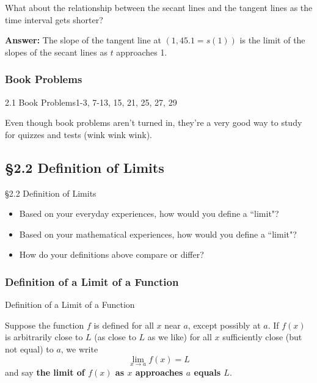 \documentclass[cal1spr16Lectures.tex]{subfiles}
\begin{document}
\begin{frame}
\begin{que} What about the relationship between the \alert{secant} lines and the \alert{tangent} lines as the time interval gets shorter? \end{que}

{\bf Answer:} The slope of the tangent line at $(1, 45.1=s(1))$ is the limit of the slopes of the secant lines as $t$ approaches 1.
\end{frame}

\subsubsection{Book Problems}
\begin{frame}
\begin{block}{2.1 Book Problems}1-3, 7-13, 15, 21, 25, 27, 29\end{block}
Even though book problems aren't turned in, they're a very good way to study for quizzes and tests (wink wink wink).  
\end{frame}

\subsection[2.2 Definition of Limits]{\S 2.2 Definition of Limits}

\begin{frame}{\S 2.2 Definition of Limits}
\begin{que} 
\begin{itemize}
	\item Based on your everyday experiences, how would you define a ``limit"? 
	\item Based on your mathematical experiences, how would you define a ``limit"?
	\item How do your definitions above compare or differ?
\end{itemize}
\end{que}
\end{frame}

\subsubsection{Definition of a Limit of a Function}
\begin{frame}{\small Definition of a Limit of a Function}
\begin{dfn}[limit]
Suppose the function $f$ is defined for all $x$ near $a$, except possibly at $a$.  If $f(x)$ is arbitrarily close to $L$ (as close to $L$ as we like) for all $x$ sufficiently close (but not equal) to $a$, we write
\[
\lim_{x\to a}f(x)=L
\]
and say \textbf{the limit of $f(x)$ as $x$ approaches $a$ equals $L$}.
\end{dfn}
\end{frame}
\end{document}
